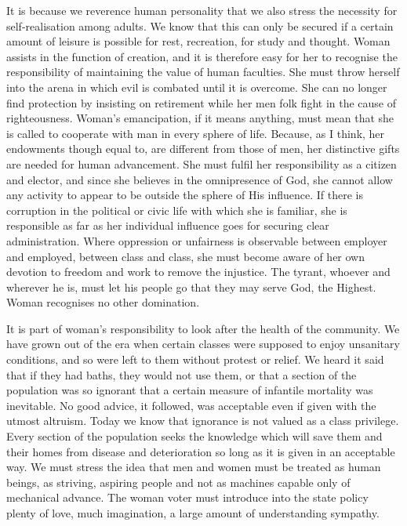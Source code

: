 It is because we reverence human personality that we
also stress the necessity for self-realisation among
adults. We know that this can only be secured if a certain
amount of leisure is possible for rest, recreation, for
study and thought. Woman assists in the function of creation,
and it is therefore easy for her to recognise the
responsibility of maintaining the value of human faculties.
She must throw herself into the arena in which evil is
combated until it is overcome. She can no longer find
protection by insisting on retirement while her men folk
fight in the cause of righteousness. Woman's emancipation,
if it means anything, must mean that she is called to
cooperate with man in every sphere of life. Because, as I
think, her endowments though equal to, are different from
those of men, her distinctive gifts are needed for human
advancement. She must fulfil her responsibility as a
citizen and elector, and since she believes in the
omnipresence of God, she cannot allow any activity to appear to
be outside the sphere of His influence. If there is
corruption in the political or civic life with which she is
familiar, she is responsible as far as her individual
influence goes for securing clear administration. Where
oppression or unfairness is observable between employer and
employed, between class and class, she must become aware of
her own devotion to freedom and work to remove the injustice.
The tyrant, whoever and wherever he is, must let his
people go that they may serve God, the Highest. Woman
recognises no other domination.

It is part of woman's responsibility to look after the
health of the community. We have grown out of the era when
certain classes were supposed to enjoy unsanitary conditions,
and so were left to them without protest or relief.
We heard it said that if they had baths, they would not use
them, or that a section of the population was so ignorant
that a certain measure of infantile mortality was
inevitable. No good advice, it followed, was acceptable
even if given with the utmost altruism. Today we know that
ignorance is not valued as a class privilege. Every
section of the population seeks the knowledge which will
save them and their homes from disease and deterioration so
long as it is given in an acceptable way. We must stress
the idea that men and women must be treated as human
beings, as striving, aspiring people and not as machines
capable only of mechanical advance. The woman voter must
introduce into the state policy plenty of love, much
imagination, a large amount of understanding sympathy.

